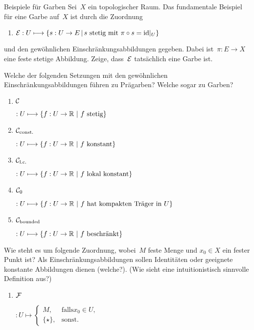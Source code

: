 \documentclass{uebblatt}
\begin{document}

\begin{aufgabe}{Beispiele für Garben}
Sei~$X$ ein topologischer Raum. Das fundamentale Beispiel für eine Garbe
auf~$X$ ist durch die Zuordnung
\begin{enumerate}
\item $\mathcal{E} : U \longmapsto \{ s : U \to E \,|\, \text{$s$ stetig mit $\pi \circ s = \mathrm{id}|_U$} \}$
\end{enumerate}
und den gewöhnlichen Einschränkungsabbildungen gegeben. Dabei ist~$\pi : E \to
X$ eine feste stetige Abbildung. Zeige, dass~$\mathcal{E}$ tatsächlich eine Garbe ist.

Welche der folgenden Setzungen mit den gewöhnlichen Einschränkungsabbildungen
führen zu Prägarben? Welche sogar zu Garben?
\newlength{\sheafname}
\begin{enumerate}
\addtocounter{enumi}{1}
\item \parbox{\sheafname}{$\mathcal{C}$} $: U \longmapsto \{ f : U \to \RR \ |\  \text{$f$ stetig} \}$
\item \parbox{\sheafname}{$\mathcal{C}_\text{const.}$} $ : U \longmapsto \{ f : U \to \RR \ |\  \text{$f$ konstant} \}$
\item \parbox{\sheafname}{$\mathcal{C}_\text{l.c.}$} $ : U \longmapsto \{ f : U \to \RR \ |\  \text{$f$ lokal konstant} \}$
\item \parbox{\sheafname}{$\mathcal{C}_\text{0}$} $ : U \longmapsto \{ f : U \to \mathbb{R} \ |\
\text{$f$ hat kompakten Träger in~$U$} \}$
\item \parbox{\sheafname}{$\mathcal{C}_\text{bounded}$} $ : U \longmapsto \{ f : U \to \RR \ |\  \text{$f$ beschränkt} \}$
\end{enumerate}
Wie steht es um folgende Zuordnung, wobei~$M$ feste
Menge und $x_0 \in X$ ein fester Punkt ist? Als Einschränkungsabbildungen
sollen Identitäten oder geeignete konstante Abbildungen dienen (welche?).
(Wie sieht eine intuitionistisch sinnvolle Definition aus?)
\begin{enumerate}
\addtocounter{enumi}{6}
\item \parbox{\sheafname}{$\mathcal{F}$} $ : U \longmapsto \begin{cases}M, & \text{falls
$x_0 \in U$}, \\ \{\star\}, & \text{sonst.}\end{cases}$
\end{enumerate}
\end{aufgabe}
\end{document}
